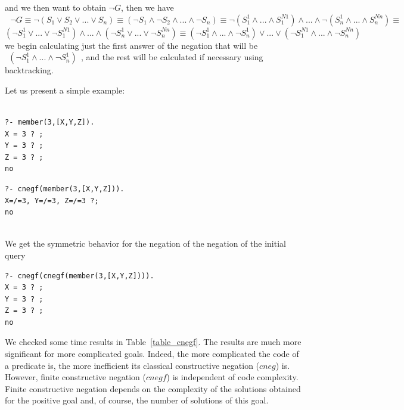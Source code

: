 \documentclass{tlp}
\begin{document}
\noindent
and we then want to obtain $\neg G$, then we have
$~~~\neg G \equiv \neg(S_1 \vee S_2 \vee ... \vee S_n) 
\equiv (\neg S_1 \wedge \neg S_2 \wedge ... \wedge \neg S_n)
\equiv \neg(S_1^1 \wedge...\wedge S_1^{N1}) \wedge ... \wedge
\neg (S_n^1 \wedge...\wedge S_n^{Nn})  \equiv $ \\
$(\neg S_1^1 \vee...\vee \neg S_1^{N1}) \wedge
... \wedge ( \neg S_n^1 \vee ...\vee \neg S_n^{Nn}) 
 \equiv (\neg S_1^1 \wedge...\wedge \neg S_n^{1}) \vee
... \vee (\neg S_1^{N1} \wedge...\wedge \neg S_n^{Nn}) $
\noindent
we begin calculating just the first answer of the negation that will
be $~~(\neg S_1^1 \wedge...\wedge \neg S_n^{1})~~ $, and the rest will
be calculated if necessary using backtracking.

Let us present a simple example:

{
\begin{minipage}{2in}
\begin{verbatim}

?- member(3,[X,Y,Z]).
X = 3 ? ;
Y = 3 ? ;
Z = 3 ? ;
no

\end{verbatim}
\end{minipage} 
\begin{minipage}{2.5in}
\begin{verbatim} 
?- cnegf(member(3,[X,Y,Z])).
X=/=3, Y=/=3, Z=/=3 ?;
no


\end{verbatim} 
\end{minipage}
}
\noindent

We get the symmetric behavior for the negation of the
negation of the initial query
{\small
\begin{verbatim}
?- cnegf(cnegf(member(3,[X,Y,Z]))).
X = 3 ? ;
Y = 3 ? ;
Z = 3 ? ;
no
\end{verbatim}
}


We checked some time results in Table~\ref{table_cnegf}. The results
are much more significant for more complicated goals. Indeed, the more
complicated the code of a predicate is, the more inefficient its
classical constructive negation ($cneg$) is. However, finite
constructive negation ($cnegf$) is independent of code
complexity. Finite constructive negation depends on the complexity of
the solutions obtained for the positive goal and, of course, the
number of solutions of this goal.



\end{document}
